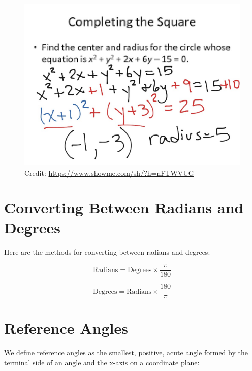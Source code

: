\documentclass[12pt]{article}
\begin{document}
\begin{figure}[ht]
	\centering
	\includegraphics[scale=.25]{completecircle.jpg}
	\caption{Credit: \url{https://www.showme.com/sh/?h=nFTWVUG}}
\end{figure}

\section{Converting Between Radians and Degrees}

Here are the methods for converting between radians and degrees:

\[ \text{Radians} = \text{Degrees} \times \frac{\pi}{180} \]

\[ \text{Degrees} = \text{Radians} \times \frac{180}{\pi} \]

\section{Reference Angles}
We define reference angles as the smallest, positive, acute angle formed by the terminal side of an angle and the x-axis on a coordinate plane:\\
\end{document}
